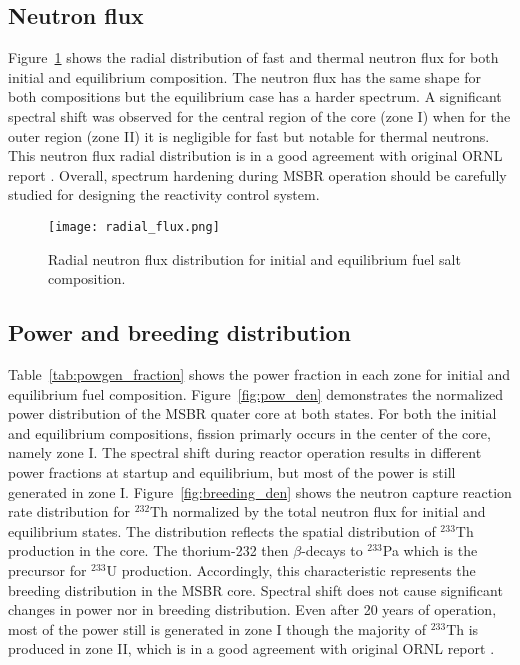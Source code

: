 \subsection{Neutron flux}
Figure~\ref{fig:radial_flux} shows the radial distribution of fast and thermal neutron flux for both initial and equilibrium composition. The neutron flux has the same shape for both compositions but the equilibrium case has a harder spectrum. A significant spectral shift was observed for the central region of the core (zone I) when for the outer region (zone II) it is negligible for fast but notable for thermal neutrons. This neutron flux radial distribution is in a good agreement with original ORNL report \cite{robertson_conceptual_1971}. Overall, spectrum hardening during \gls{MSBR} operation should be carefully studied for designing the reactivity control system.

\begin{figure}[htp!] %
  \centering
  \texttt{[image: radial\_flux.png]} 
  \caption{Radial neutron flux distribution for initial and equilibrium fuel salt composition.}
  \label{fig:radial_flux}
\end{figure}
\FloatBarrier

\subsection{Power and breeding distribution}
Table~\ref{tab:powgen_fraction} shows the power fraction in each zone for initial and equilibrium fuel composition. Figure~\ref{fig:pow_den} demonstrates the normalized power distribution of the \gls{MSBR} quater core at both states. For both the initial and equilibrium compositions, fission primarly occurs in the center of the core, namely zone I. The spectral shift during reactor operation results in different power fractions at startup and equilibrium, but most of the power is still generated in zone I. Figure~\ref{fig:breeding_den} shows the neutron capture reaction rate distribution for $^{232}$Th normalized by the total neutron flux for initial and equilibrium states. The distribution reflects the spatial distribution of $^{233}$Th production in the core. The thorium-232 then $\beta$-decays to $^{233}$Pa which is the precursor for $^{233}$U production. Accordingly, this characteristic represents the breeding distribution in the \gls{MSBR} core. Spectral shift does not cause significant changes in power nor in breeding distribution. Even after 20 years of operation, most of the power still is generated in zone I though the majority of $^{233}$Th is produced in zone II, which is in a good agreement with original ORNL report \cite{robertson_conceptual_1971}.

